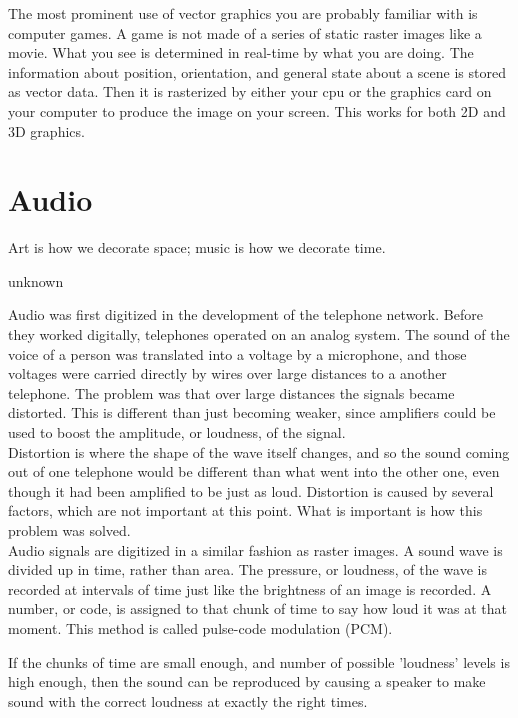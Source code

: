 The most prominent use of vector graphics you are probably familiar with is computer games. A game is not made of a series of static raster images like a movie. What you see is determined in real-time by what you are doing. The information about position, orientation, and general state about a scene is stored as vector data. Then it is rasterized by either your cpu or the graphics card on your computer to produce the image on your screen. This works for both 2D and 3D graphics.\\



\section{Audio}

\epigraph{Art is how we decorate space; music is how we decorate time.}{unknown}

Audio was first digitized in the development of the telephone network. Before they worked digitally, telephones operated on an analog system. The sound of the voice of a person was translated into a voltage by a microphone, and those voltages were carried directly by wires over large distances to a another telephone. The problem was that over large distances the signals became distorted. This is different than just becoming weaker, since amplifiers could be used to boost the amplitude, or loudness, of the signal.\\

Distortion is where the shape of the wave itself changes, and so the sound coming out of one telephone would be different than what went into the other one, even though it had been amplified to be just as loud. Distortion is caused by several factors, which are not important at this point. What is important is how this problem was solved.\\

Audio signals are digitized in a similar fashion as raster images. A sound wave is divided up in time, rather than area. The pressure, or loudness, of the wave is recorded at intervals of time just like the brightness of an image is recorded. A number, or code, is assigned to that chunk of time to say how loud it was at that moment. This method is called pulse-code modulation (PCM).

If the chunks of time are small enough, and number of possible 'loudness' levels is high enough, then the sound can be reproduced by causing a speaker to make sound with the correct loudness at exactly the right times.\\

